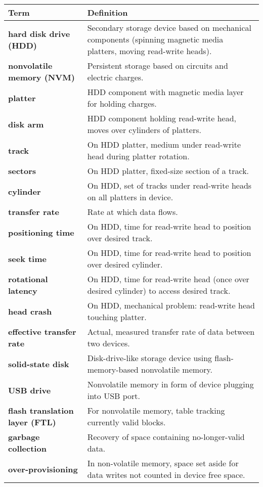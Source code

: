 \vspace{1em}
\begin{tabular}{p{}p{}}
\toprule
\rowcolor{lightgray} \textbf{Term} & \textbf{Definition} \\
\midrule
\textbf{hard disk drive (HDD)} & Secondary storage device based on mechanical components (spinning magnetic media platters, moving read-write heads). \\
\textbf{nonvolatile memory (NVM)} & Persistent storage based on circuits and electric charges. \\
\textbf{platter} & HDD component with magnetic media layer for holding charges. \\
\textbf{disk arm} & HDD component holding read-write head, moves over cylinders of platters. \\
\textbf{track} & On HDD platter, medium under read-write head during platter rotation. \\
\textbf{sectors} & On HDD platter, fixed-size section of a track. \\
\textbf{cylinder} & On HDD, set of tracks under read-write heads on all platters in device. \\
\textbf{transfer rate} & Rate at which data flows. \\
\textbf{positioning time} & On HDD, time for read-write head to position over desired track. \\
\textbf{seek time} & On HDD, time for read-write head to position over desired cylinder. \\
\textbf{rotational latency} & On HDD, time for read-write head (once over desired cylinder) to access desired track. \\
\textbf{head crash} & On HDD, mechanical problem: read-write head touching platter. \\
\textbf{effective transfer rate} & Actual, measured transfer rate of data between two devices. \\
\textbf{solid-state disk} & Disk-drive-like storage device using flash-memory-based nonvolatile memory. \\
\textbf{USB drive} & Nonvolatile memory in form of device plugging into USB port. \\
\textbf{flash translation layer (FTL)} & For nonvolatile memory, table tracking currently valid blocks. \\
\textbf{garbage collection} & Recovery of space containing no-longer-valid data. \\
\textbf{over-provisioning} & In non-volatile memory, space set aside for data writes not counted in device free space. \\

\end{tabular}
